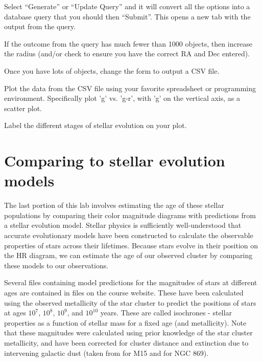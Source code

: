 \begin{steps}
	\item Select ``Generate'' or ``Update Query'' and it will convert all the options into a database query that you should then ``Submit''. This opens a new tab with the output from the query.
	
	\item If the outcome from the query has much fewer than 1000 objects, then increase the radius (and/or check to ensure you have the correct RA and Dec entered).
	
	\item Once you have lots of objects, change the form to output a CSV file.
	
	\item Plot the data from the CSV file using your favorite spreadsheet or programming environment. Specifically plot 'g' vs. 'g-r', with 'g' on the vertical axis, as a scatter plot.

	\item Label the different stages of stellar evolution on your plot.
\end{steps}

\section{Comparing to stellar evolution models}

The last portion of this lab involves estimating the age of these stellar populations by comparing their color magnitude diagrams with predictions from a stellar evolution model. Stellar physics is sufficiently well-understood that accurate evolutionary models have been constructed to calculate the observable properties of stars across their lifetimes. Because stars evolve in their position on the HR diagram, we can estimate the age of our observed cluster by comparing these models to our observations.

Several files containing model predictions for the magnitudes of stars at different ages are contained in files on the course website. These have been calculated using the observed metallicity of the star cluster to predict the positions of stars at ages $10^7$, $10^8$, $10^9$, and $10^{10}$ years. These are called isochrones - stellar properties as a function of stellar mass for a fixed age (and metallicity). Note that these magnitudes were calculated using prior knowledge of the star cluster metallicity, and have been corrected for cluster distance and extinction due to intervening galactic dust (taken from \cite{DurrellHarris1993} for M15 and \cite{Currie2010} for NGC 869).

